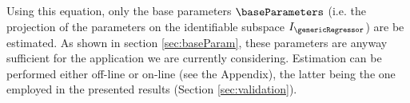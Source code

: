 Using this equation, only the base parameters $\baseParameters$ (i.e. the projection of the parameters on the identifiable subspace $I_{\genericRegressor}$) are be estimated. As shown in section \ref{sec:baseParam}, these parameters are anyway sufficient for the application we are currently considering. Estimation can be performed either off-line or on-line (see the Appendix), the latter being the one employed in the presented results (Section \ref{sec:validation}). 



